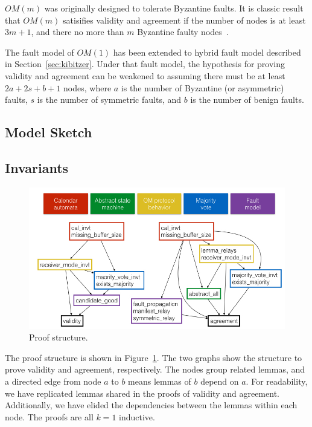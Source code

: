 \documentclass{llncs/llncs}
\newcommand{\lee}[1]{ } %
\newcommand{\lee}[1]{ {\color{blue}$<$lee: #1$>$} } %
\begin{document}
$OM(m)$ was originally designed to tolerate Byzantine faults. It is classic
result that $OM(m)$ satisifies validity and agreement if the number of
nodes is at least $3m+1$, and there no more than $m$
Byzantine faulty nodes~\cite{}.

The fault model of $OM(1)$ has been extended to hybrid fault model described in Section~\ref{sec:kibitzer}. Under that fault model, the hypothesis for proving validity and agreement can be weakened to assuming there must be at least $2a+2s+b+1$ nodes, where $a$ is the number of Byzantine (or asymmetric) faults, $s$ is the number of symmetric faults, and $b$ is the number of benign faults. \lee{is the right?}

\subsection{Model Sketch}

\subsection{Invariants}

\begin{figure}
  \centering
  \includegraphics[width=\textwidth]{figs/proof-structure}
  \caption{Proof structure.}
  \label{fig:proof}
\end{figure}

The proof structure is shown in Figure~\ref{fig:proof}. The two graphs show the structure to prove validity and agreement, respectively. The nodes group related lemmas, and a directed edge from node $a$ to $b$ means lemmas of $b$ depend on $a$. For readability, we have replicated lemmas shared in the proofs of validity and agreement. Additionally, we have elided the dependencies between the lemmas within each node. The proofs are all $k=1$ inductive.
\end{document}
